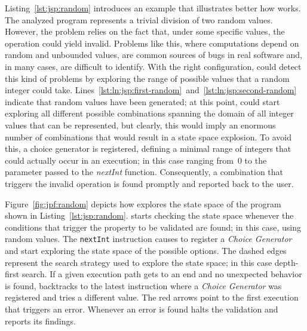 Listing~\ref{lst:jsp:random} introduces an example that illustrates better how \jpf{} works. The analyzed program represents a trivial division of two random values. However, the problem relies on the fact that, under some specific values, the operation could yield invalid. Problems like this, where computations depend on random and unbounded values, are common sources of bugs in real software and, in many cases, are difficult to identify. With the right configuration, \jpf{} could detect this kind of problems by exploring the range of possible values that a random integer could take. Lines~\ref{lst:ln:jsp:first-random}~and~\ref{lst:ln:jsp:second-random} indicate that random values have been generated; at this point, \jpf{} could start exploring all different possible combinations spanning the domain of all integer values that can be represented, but clearly, this would imply an enormous number of combinations that would result in a state space explosion. To avoid this, a choice generator is registered, defining a minimal range of integers that could actually occur in an execution; in this case ranging from~0 to the parameter passed to the \textit{nextInt} function. Consequently, a combination that triggers the invalid operation is found promptly and reported back to the user. 

Figure~\ref{fig:jpf:random} depicts how \jpf{} explores the state space of the program shown in Listing~\ref{lst:jsp:random}. \jpf{} starts checking the state space whenever the conditions that trigger the property to be validated are found; in this case, using random values. The \texttt{nextInt} instruction causes \jpf{} to register a \textit{Choice Generator} and start exploring the state space of the possible options. The dashed edges represent the search strategy used to explore the state space; in this case depth-first search. If a given execution path gets to an end and no unexpected behavior is found, \jpf{} backtracks to the latest instruction where a \textit{Choice Generator} was registered and tries a different value. The red arrows point to the first execution that triggers an error. Whenever an error is found \jpf{} halts the validation and reports its findings.

